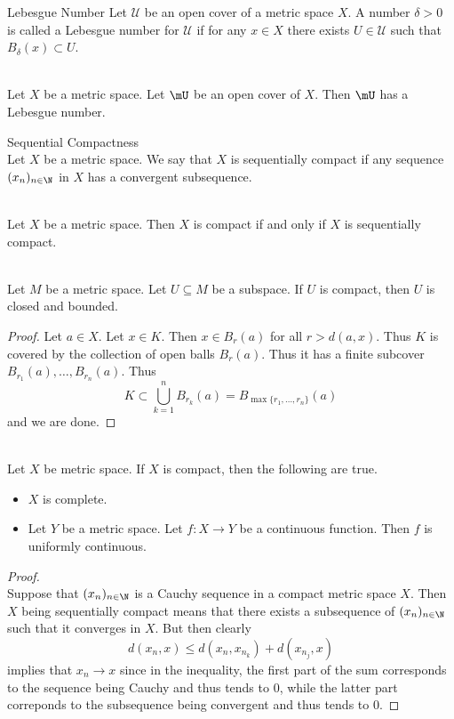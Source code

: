 \documentclass[a4paper]{article}
\begin{document}
\begin{defn}{Lebesgue Number}{} Let $\mathcal{U}$ be an open cover of a metric space $X$. A number $\delta>0$ is called a Lebesgue number for $\mathcal{U}$ if for any $x\in X$ there exists $U\in\mathcal{U}$ such that $B_\delta(x)\subset U$. 
\end{defn}

\begin{lmm}{}{}\\
Let $X$ be a metric space. Let $\mU$ be an open cover of $X$. Then $\mU$ has a Lebesgue number. 
\end{lmm}

\begin{defn}{Sequential Compactness}{}\\
Let $X$ be a metric space. We say that $X$ is sequentially compact if any sequence $(x_n)_{n\in\N}$ in $X$ has a convergent subsequence. 
\end{defn}

\begin{prp}{}{}\\
Let $X$ be a metric space. Then $X$ is compact if and only if $X$ is sequentially compact. 
\end{prp}

\begin{prp}{}{}\\
Let $M$ be a metric space. Let $U\subseteq M$ be a subspace. If $U$ is compact, then $U$ is closed and bounded. 
\begin{proof}
Let $a\in X$. Let $x\in K$. Then $x\in B_r(a)$ for all $r>d(a,x)$. Thus $K$ is covered by the collection of open balls $B_r(a)$. Thus it has a finite subcover $B_{r_1}(a),\dots,B_{r_n}(a)$. Thus $$K\subset\bigcup_{k=1}^nB_{r_k}(a)=B_{\max\{r_1,\dots,r_n\}}(a)$$ and we are done. 
\end{proof}
\end{prp}

\begin{prp}{}{}\\
Let $X$ be metric space. If $X$ is compact, then the following are true. 
\begin{itemize}
\item $X$ is complete. 
\item Let $Y$ be a metric space. Let $f:X\to Y$ be a continuous function. Then $f$ is uniformly continuous. 
\end{itemize}
\begin{proof}\\
Suppose that $(x_n)_{n\in\N}$ is a Cauchy sequence in a compact metric space $X$. Then $X$ being sequentially compact means that there exists a subsequence of $(x_n)_{n\in\N}$ such that it converges in $X$. But then clearly $$d(x_n,x)\leq d(x_n,x_{n_k})+d(x_{n_j},x)$$ implies that $x_n\to x$ since in the inequality, the first part of the sum corresponds to the sequence being Cauchy and thus tends to $0$, while the latter part correponds to the subsequence being convergent and thus tends to $0$. 
\end{proof}
\end{prp}
\end{document}
